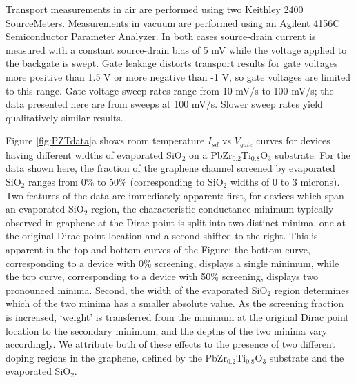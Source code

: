 \documentclass[edeposit,fullpage,draftthesis]{uiucthesis2009}
\begin{document}
Transport measurements in air are performed using two Keithley 2400 SourceMeters. Measurements in vacuum are performed using an Agilent 4156C Semiconductor Parameter Analyzer. In both cases source-drain current is measured with a constant source-drain bias of 5 mV while the voltage applied to the backgate is swept. Gate leakage distorts transport results for gate voltages more positive than 1.5 V or more negative than -1 V, so gate voltages are limited to this range. Gate voltage sweep rates range from 10 mV/s to 100 mV/s; the data presented here are from sweeps at 100 mV/s. Slower sweep rates yield qualitatively similar results.


Figure \ref{fig:PZTdata}a shows room temperature $I_{sd}$ vs $V_{gate}$ curves for devices having different widths of evaporated SiO$_2$ on a PbZr$_{0.2}$Ti$_{0.8}$O$_3$ substrate. For the data shown here, the fraction of the graphene channel screened by evaporated SiO$_2$ ranges from 0\% to 50\% (corresponding to SiO$_2$ widths of 0 to 3 microns). Two features of the data are immediately apparent: first, for devices which span an evaporated SiO$_2$ region, the characteristic conductance minimum typically observed in graphene at the Dirac point is split into two distinct minima, one at the original Dirac point location and a second shifted to the right. This is apparent in the top and bottom curves of the Figure: the bottom curve, corresponding to a device with 0\% screening, displays a single minimum, while the top curve, corresponding to a device with 50\% screening, displays two pronounced minima. Second, the width of the evaporated SiO$_2$ region determines which of the two minima has a smaller absolute value. As the screening fraction is increased, `weight' is transferred from the minimum at the original Dirac point location to the secondary minimum, and the depths of the two minima vary accordingly. We attribute both of these effects to the presence of two different doping regions in the graphene, defined by the PbZr$_{0.2}$Ti$_{0.8}$O$_3$ substrate and the evaporated SiO$_2$.
\end{document}

